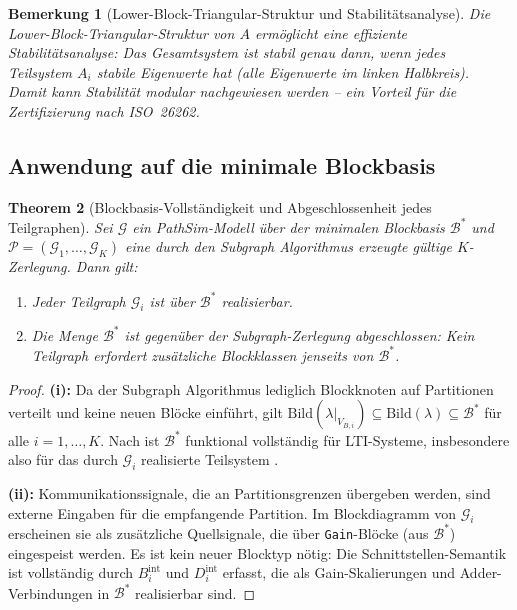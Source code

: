 ﻿\documentclass[12pt,a4paper]{article}
\newtheorem{theorem}{Theorem}[section]
\newtheorem{bemerkung}[theorem]{Bemerkung}
\theoremstyle{definition}
\begin{document}
\begin{bemerkung}[Lower-Block-Triangular-Struktur und Stabilitätsanalyse]
\label{bem:lbt}
Die Lower-Block-Triangular-Struktur von $A$ ermöglicht eine effiziente
Stabilitätsanalyse: Das Gesamtsystem ist stabil genau dann, wenn jedes
Teilsystem $A_i$ stabile Eigenwerte hat (alle Eigenwerte im linken Halbkreis).
Damit kann Stabilität \emph{modular} nachgewiesen werden -- ein Vorteil
für die Zertifizierung nach ISO~26262.
\end{bemerkung}

\subsection{Anwendung auf die minimale Blockbasis}
\label{subsec:subgraph-basis}

\begin{theorem}[Blockbasis-Vollständigkeit und Abgeschlossenheit jedes Teilgraphen]
\label{thm:subgraph-basis}
Sei $\mathcal{G}$ ein PathSim-Modell über der minimalen Blockbasis
$\mathcal{B}^*$ und $\mathcal{P} = (\mathcal{G}_1, \ldots, \mathcal{G}_K)$
eine durch den Subgraph Algorithmus erzeugte gültige $K$-Zerlegung.
Dann gilt:
\begin{enumerate}[label=(\roman*), nosep]
  \item Jeder Teilgraph $\mathcal{G}_i$ ist über $\mathcal{B}^*$ realisierbar.
  \item Die Menge $\mathcal{B}^*$ ist gegenüber der Subgraph-Zerlegung
        abgeschlossen: Kein Teilgraph erfordert zusätzliche Blockklassen
        jenseits von $\mathcal{B}^*$.
\end{enumerate}
\end{theorem}

\begin{proof}
\textbf{(i):}
Da der Subgraph Algorithmus lediglich Blockknoten auf Partitionen verteilt
und keine neuen Blöcke einführt, gilt
$\mathrm{Bild}(\lambda|_{V_{B,i}}) \subseteq \mathrm{Bild}(\lambda)
\subseteq \mathcal{B}^*$ für alle $i = 1, \ldots, K$.
Nach  ist $\mathcal{B}^*$ funktional vollständig
für LTI-Systeme, insbesondere also für das durch $\mathcal{G}_i$
realisierte Teilsystem .

\textbf{(ii):}
Kommunikationssignale, die an Partitionsgrenzen übergeben werden,
sind externe Eingaben für die empfangende Partition. Im Blockdiagramm
von $\mathcal{G}_i$ erscheinen sie als zusätzliche Quellsignale, die
über \texttt{Gain}-Blöcke (aus $\mathcal{B}^*$) eingespeist werden.
Es ist kein neuer Blocktyp nötig: Die Schnittstellen-Semantik ist
vollständig durch $B_i^{\mathrm{int}}$ und $D_i^{\mathrm{int}}$ erfasst,
die als Gain-Skalierungen und Adder-Verbindungen in $\mathcal{B}^*$
realisierbar sind.
\end{proof}
\end{document}

